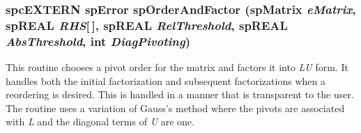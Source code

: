 \subsubsection{\setlength{\rightskip}{0pt plus 5cm}spc\-EXTERN {\bf sp\-Error} sp\-Order\-And\-Factor ({\bf sp\-Matrix} {\em e\-Matrix}, sp\-REAL {\em RHS}[$\,$], sp\-REAL {\em Rel\-Threshold}, sp\-REAL {\em Abs\-Threshold}, int {\em Diag\-Pivoting})}\label{spMatrix_8h_a46}


This routine chooses a pivot order for the matrix and factors it into {\em LU} form. It handles both the initial factorization and subsequent factorizations when a reordering is desired. This is handled in a manner that is transparent to the user. The routine uses a variation of Gauss's method where the pivots are associated with {\em L} and the diagonal terms of {\em U} are one.

